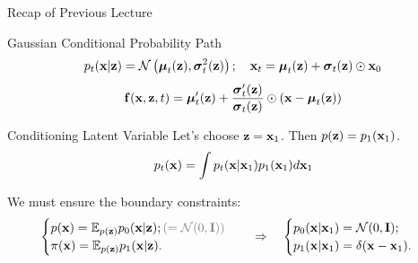 \documentclass{beamer}
\begin{document}
\begin{frame}{Recap of Previous Lecture}
	\begin{block}{Gaussian Conditional Probability Path}
		\vspace{-0.3cm}
		\[
			p_t(\mathbf{x} | \mathbf{z}) = \mathcal{N}\left(\boldsymbol{\mu}_t(\mathbf{z}), \boldsymbol{\sigma}_t^2(\mathbf{z})\right); \quad \mathbf{x}_t = \boldsymbol{\mu}_t(\mathbf{z}) + \boldsymbol{\sigma}_t(\mathbf{z}) \odot \mathbf{x}_0
		\]
		\vspace{-0.3cm}
		\[
			\mathbf{f}(\mathbf{x}, \mathbf{z}, t) =  \boldsymbol{\mu}_t'(\mathbf{z}) + \frac{\boldsymbol{\sigma}_t'(\mathbf{z})}{\boldsymbol{\sigma}_t(\mathbf{z})} \odot (\mathbf{x} - \boldsymbol{\mu}_t(\mathbf{z}))
		\]
		\vspace{-0.3cm}
	\end{block}
	\begin{block}{Conditioning Latent Variable}
		Let’s choose $\mathbf{z} = \mathbf{x}_1$. Then $p(\mathbf{z}) = p_1(\mathbf{x}_1)$.
		\[
			p_t(\mathbf{x}) = \int p_t(\mathbf{x} | \mathbf{x}_1) p_1(\mathbf{x}_1) d \mathbf{x}_1
		\]
		\vspace{-0.5cm}
	\end{block}
	We must ensure the boundary constraints:
	\[
		\begin{cases}
			p(\bx) = \bbE_{p(\bz)} p_0(\bx | \bz); {\color{gray}(= \cN(0, \bI))} \\
			\pi(\bx) = \bbE_{p(\bz)} p_1(\bx | \bz).
		\end{cases}
		\quad \Rightarrow \quad 
		\begin{cases}
			p_0(\bx | \bx_1) = \cN(0, \bI); \\
			p_1(\bx | \bx_1) = \delta(\bx - \bx_1).
		\end{cases}
	\]
	\vspace{-0.3cm}
\end{frame}
\end{document}
